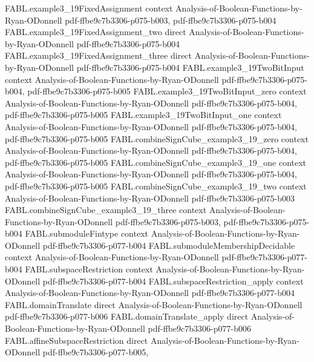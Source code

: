 \begin{theorem}
  {FABL.example3_19FixedAssignment}
  {context}
  {Analysis-of-Boolean-Functions-by-Ryan-ODonnell}
  {pdf-ffbe9c7b3306-p075-b003,
    pdf-ffbe9c7b3306-p075-b004}
\proofstep
  {FABL.example3_19FixedAssignment_two}
  {direct}
  {Analysis-of-Boolean-Functions-by-Ryan-ODonnell}
  {pdf-ffbe9c7b3306-p075-b004}
\proofstep
  {FABL.example3_19FixedAssignment_three}
  {direct}
  {Analysis-of-Boolean-Functions-by-Ryan-ODonnell}
  {pdf-ffbe9c7b3306-p075-b004}
\proofstep
  {FABL.example3_19TwoBitInput}
  {context}
  {Analysis-of-Boolean-Functions-by-Ryan-ODonnell}
  {pdf-ffbe9c7b3306-p075-b004,
    pdf-ffbe9c7b3306-p075-b005}
\proofstep
  {FABL.example3_19TwoBitInput_zero}
  {context}
  {Analysis-of-Boolean-Functions-by-Ryan-ODonnell}
  {pdf-ffbe9c7b3306-p075-b004,
    pdf-ffbe9c7b3306-p075-b005}
\proofstep
  {FABL.example3_19TwoBitInput_one}
  {context}
  {Analysis-of-Boolean-Functions-by-Ryan-ODonnell}
  {pdf-ffbe9c7b3306-p075-b004,
    pdf-ffbe9c7b3306-p075-b005}
\proofstep
  {FABL.combineSignCube_example3_19_zero}
  {context}
  {Analysis-of-Boolean-Functions-by-Ryan-ODonnell}
  {pdf-ffbe9c7b3306-p075-b004,
    pdf-ffbe9c7b3306-p075-b005}
\proofstep
  {FABL.combineSignCube_example3_19_one}
  {context}
  {Analysis-of-Boolean-Functions-by-Ryan-ODonnell}
  {pdf-ffbe9c7b3306-p075-b004,
    pdf-ffbe9c7b3306-p075-b005}
\proofstep
  {FABL.combineSignCube_example3_19_two}
  {context}
  {Analysis-of-Boolean-Functions-by-Ryan-ODonnell}
  {pdf-ffbe9c7b3306-p075-b003}
\proofstep
  {FABL.combineSignCube_example3_19_three}
  {context}
  {Analysis-of-Boolean-Functions-by-Ryan-ODonnell}
  {pdf-ffbe9c7b3306-p075-b003,
    pdf-ffbe9c7b3306-p075-b004}
\proofstep
  {FABL.submoduleFintype}
  {context}
  {Analysis-of-Boolean-Functions-by-Ryan-ODonnell}
  {pdf-ffbe9c7b3306-p077-b004}
\proofstep
  {FABL.submoduleMembershipDecidable}
  {context}
  {Analysis-of-Boolean-Functions-by-Ryan-ODonnell}
  {pdf-ffbe9c7b3306-p077-b004}
\proofstep
  {FABL.subspaceRestriction}
  {context}
  {Analysis-of-Boolean-Functions-by-Ryan-ODonnell}
  {pdf-ffbe9c7b3306-p077-b004}
\proofstep
  {FABL.subspaceRestriction_apply}
  {context}
  {Analysis-of-Boolean-Functions-by-Ryan-ODonnell}
  {pdf-ffbe9c7b3306-p077-b004}
\proofstep
  {FABL.domainTranslate}
  {direct}
  {Analysis-of-Boolean-Functions-by-Ryan-ODonnell}
  {pdf-ffbe9c7b3306-p077-b006}
\proofstep
  {FABL.domainTranslate_apply}
  {direct}
  {Analysis-of-Boolean-Functions-by-Ryan-ODonnell}
  {pdf-ffbe9c7b3306-p077-b006}
\proofstep
  {FABL.affineSubspaceRestriction}
  {direct}
  {Analysis-of-Boolean-Functions-by-Ryan-ODonnell}
  {pdf-ffbe9c7b3306-p077-b005,
}
\end{theorem}
